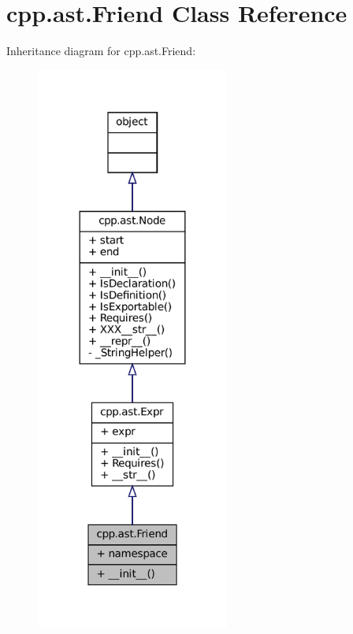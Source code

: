 \hypertarget{classcpp_1_1ast_1_1Friend}{}\section{cpp.\+ast.\+Friend Class Reference}
\label{classcpp_1_1ast_1_1Friend}


Inheritance diagram for cpp.\+ast.\+Friend\+:
\nopagebreak
\begin{figure}[H]
\begin{center}
\leavevmode
\includegraphics[width=180pt]{classcpp_1_1ast_1_1Friend__inherit__graph}
\end{center}
\end{figure}



